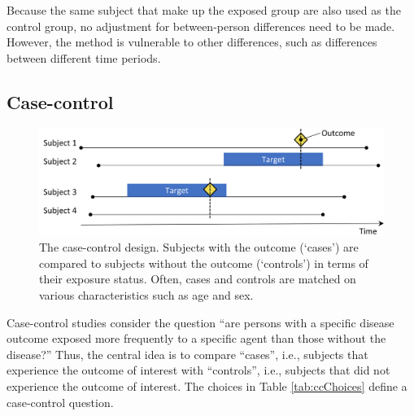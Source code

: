 \documentclass[]{book}
\begin{document}
Because the same subject that make up the exposed group are also used as
the control group, no adjustment for between-person differences need to
be made. However, the method is vulnerable to other differences, such as
differences between different time periods.

\subsection{Case-control}\label{case-control}

\begin{figure}

{\centering \includegraphics[width=0.9\linewidth]{images/PopulationLevelEstimation/caseControl} 

}

\caption{The case-control design. Subjects with the outcome (‘cases’) are compared to subjects without the outcome (‘controls’) in terms of their exposure status. Often, cases and controls are matched on various characteristics such as age and sex.}\label{fig:caseControl}
\end{figure}

Case-control \citep{vandenbroucke_2012} studies consider the question
``are persons with a specific disease outcome exposed more frequently to
a specific agent than those without the disease?'' Thus, the central
idea is to compare ``cases'', i.e., subjects that experience the outcome
of interest with ``controls'', i.e., subjects that did not experience
the outcome of interest. The choices in Table \ref{tab:ccChoices} define
a case-control question.
\end{document}
